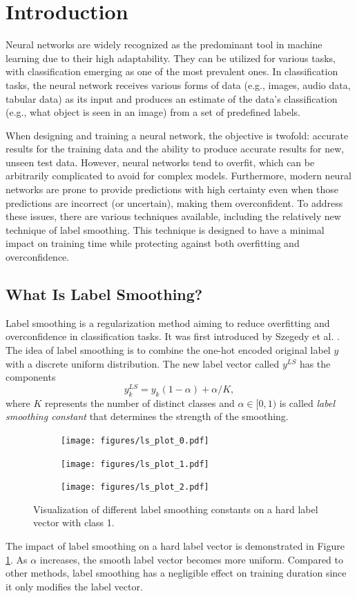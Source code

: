 \section{Introduction}
Neural networks are widely recognized as the predominant tool in machine learning due to their high adaptability. They can be utilized for various tasks, with classification emerging as one of the most prevalent ones. In classification tasks, the neural network receives various forms of data (e.g., images, audio data, tabular data) as its input and produces an estimate of the data's classification (e.g., what object is seen in an image) from a set of predefined labels.

When designing and training a neural network, the objective is twofold: accurate results for the training data and the ability to produce accurate results for new, unseen test data. However, neural networks tend to overfit, which can be arbitrarily complicated to avoid for complex models. Furthermore, modern neural networks are prone to provide predictions with high certainty even when those predictions are incorrect (or uncertain), making them overconfident.
To address these issues, there are various techniques available, including the relatively new technique of label smoothing. This technique is designed to have a minimal impact on training time while protecting against both overfitting and overconfidence.

\subsection{What Is Label Smoothing?}
Label smoothing is a regularization method aiming to reduce overfitting and overconfidence in classification tasks. It was first introduced by Szegedy et al. \cite{szegedy2016}. The idea of label smoothing is to combine the one-hot encoded original label $y$ with a discrete uniform distribution. The  new label vector called $y^{LS}$ has the components 
$$y^{LS}_k=y_k(1-\alpha)+\alpha/K,$$ where $K$ represents the number of distinct classes and $\alpha\in\lbrack0,1)$ is called \textit{label smoothing constant} that determines the strength of the smoothing.
\begin{figure}[ht]
    \centering
    \begin{subfigure}{0.32\textwidth}
        \texttt{[image: figures/ls\_plot\_0.pdf]}
    \end{subfigure}
    \begin{subfigure}{0.32\textwidth}
        \texttt{[image: figures/ls\_plot\_1.pdf]}
    \end{subfigure}
    \begin{subfigure}{0.32\textwidth}
        \texttt{[image: figures/ls\_plot\_2.pdf]}
    \end{subfigure}
    \caption{Visualization of different label smoothing constants on a hard label vector with class 1.}
    \label{fig:lab_vis}
\end{figure}
The impact of label smoothing on a hard label vector is demonstrated in Figure \ref{fig:lab_vis}. As $\alpha$ increases, the smooth label vector becomes more uniform. Compared to other methods, label smoothing has a negligible effect on training duration since it only modifies the label vector.

